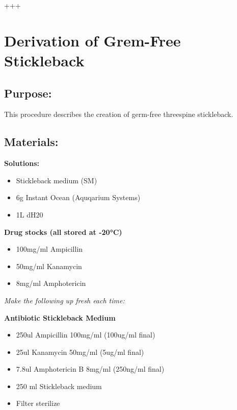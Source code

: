 \documentclass[
]{book}
\providecommand{\tightlist}{%
  \setlength{\itemsep}{0pt}\setlength{\parskip}{0pt}}
\begin{document}
+++

\hypertarget{derivation-of-grem-free-stickleback}{%
\section{Derivation of Grem-Free Stickleback}\label{derivation-of-grem-free-stickleback}}

\hypertarget{purpose-6}{%
\subsection{Purpose:}\label{purpose-6}}

This procedure describes the creation of germ-free threespine stickleback.

\hypertarget{materials-12}{%
\subsection{Materials:}\label{materials-12}}

\textbf{Solutions:}

\begin{itemize}
\tightlist
\item
  Stickleback medium (SM)
\item
  6g Instant Ocean (Aquqarium Systems)
\item
  1L dH20
\end{itemize}

\textbf{Drug stocks (all stored at -20°C)}

\begin{itemize}
\tightlist
\item
  100mg/ml Ampicillin
\item
  50mg/ml Kanamycin
\item
  8mg/ml Amphotericin
\end{itemize}

\emph{Make the following up fresh each time:}

\textbf{Antibiotic Stickleback Medium}

\begin{itemize}
\tightlist
\item
  250ul Ampicillin 100mg/ml (100ug/ml final)
\item
  25ul Kanamycin 50mg/ml (5ug/ml final)
\item
  7.8ul Amphotericin B 8mg/ml (250ng/ml final)
\item
  250 ml Stickleback medium
\item
  Filter sterilize
\end{itemize}
\end{document}
